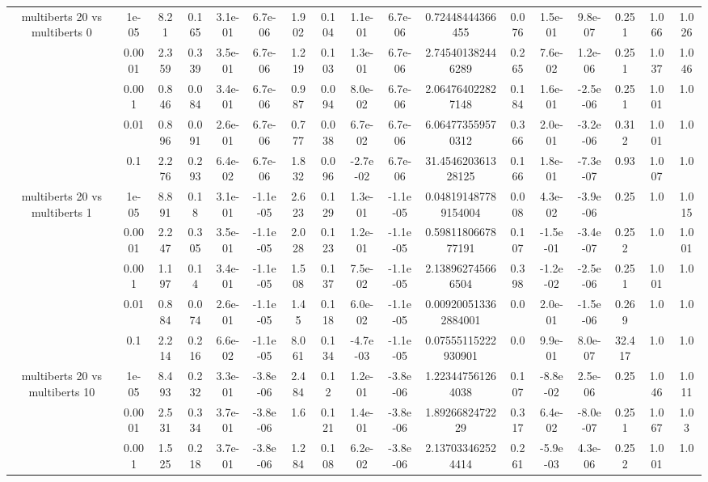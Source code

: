 \begin{tabular}{|c|c|c|c|c|c|c|c|c|c|c|c|c|c|c|c|c|}
\hline
\multirow{5}{*}{multiberts 20 vs multiberts 0} & 1e-05 & 8.21 & 0.165 & 3.1e-01 & 6.7e-06 & 1.902 & 0.104 & 1.1e-01 & 6.7e-06 & 0.72448444366455 & 0.076 & 1.5e-01 & 9.8e-07 & 0.251 & 1.066 & 1.026 \\
 & 0.0001 & 2.359 & 0.339 & 3.5e-01 & 6.7e-06 & 1.219 & 0.103 & 1.3e-01 & 6.7e-06 & 2.745401382446289 & 0.265 & 7.6e-02 & 1.2e-06 & 0.251 & 1.037 & 1.046 \\
 & 0.001 & 0.846 & 0.084 & 3.4e-01 & 6.7e-06 & 0.987 & 0.094 & 8.0e-02 & 6.7e-06 & 2.064764022827148 & 0.184 & 1.6e-01 & -2.5e-06 & 0.251 & 1.001 & 1.0 \\
 & 0.01 & 0.896 & 0.091 & 2.6e-01 & 6.7e-06 & 0.777 & 0.038 & 6.7e-02 & 6.7e-06 & 6.064773559570312 & 0.366 & 2.0e-01 & -3.2e-06 & 0.312 & 1.001 & 1.0 \\
 & 0.1 & 2.276 & 0.293 & 6.4e-02 & 6.7e-06 & 1.832 & 0.096 & -2.7e-02 & 6.7e-06 & 31.454620361328125 & 0.166 & 1.8e-01 & -7.3e-07 & 0.93 & 1.007 & 1.0 \\
\hline
\multirow{5}{*}{multiberts 20 vs multiberts 1} & 1e-05 & 8.891 & 0.18 & 3.1e-01 & -1.1e-05 & 2.623 & 0.129 & 1.3e-01 & -1.1e-05 & 0.048191487789154004 & 0.008 & 4.3e-02 & -3.9e-06 & 0.25 & 1.0 & 1.015 \\
 & 0.0001 & 2.247 & 0.305 & 3.5e-01 & -1.1e-05 & 2.028 & 0.123 & 1.2e-01 & -1.1e-05 & 0.5981180667877191 & 0.107 & -1.5e-01 & -3.4e-07 & 0.252 & 1.0 & 1.001 \\
 & 0.001 & 1.197 & 0.14 & 3.4e-01 & -1.1e-05 & 1.508 & 0.137 & 7.5e-02 & -1.1e-05 & 2.138962745666504 & 0.398 & -1.2e-02 & -2.5e-06 & 0.251 & 1.001 & 1.0 \\
 & 0.01 & 0.884 & 0.074 & 2.6e-01 & -1.1e-05 & 1.45 & 0.118 & 6.0e-02 & -1.1e-05 & 0.009200513362884001 & 0.0 & 2.0e-01 & -1.5e-06 & 0.269 & 1.0 & 1.0 \\
 & 0.1 & 2.214 & 0.216 & 6.6e-02 & -1.1e-05 & 8.061 & 0.134 & -4.7e-03 & -1.1e-05 & 0.07555115222930901 & 0.0 & 9.9e-01 & 8.0e-07 & 32.417 & 1.0 & 1.0 \\
\hline
\multirow{5}{*}{multiberts 20 vs multiberts 10} & 1e-05 & 8.493 & 0.232 & 3.3e-01 & -3.8e-06 & 2.484 & 0.12 & 1.2e-01 & -3.8e-06 & 1.223447561264038 & 0.107 & -8.8e-02 & 2.5e-06 & 0.25 & 1.046 & 1.011 \\
 & 0.0001 & 2.531 & 0.334 & 3.7e-01 & -3.8e-06 & 1.6 & 0.121 & 1.4e-01 & -3.8e-06 & 1.8926682472229 & 0.317 & 6.4e-02 & -8.0e-07 & 0.251 & 1.067 & 1.03 \\
 & 0.001 & 1.525 & 0.218 & 3.7e-01 & -3.8e-06 & 1.284 & 0.108 & 6.2e-02 & -3.8e-06 & 2.137033462524414 & 0.261 & -5.9e-03 & 4.3e-06 & 0.252 & 1.001 & 1.0 \\

\end{tabular}
